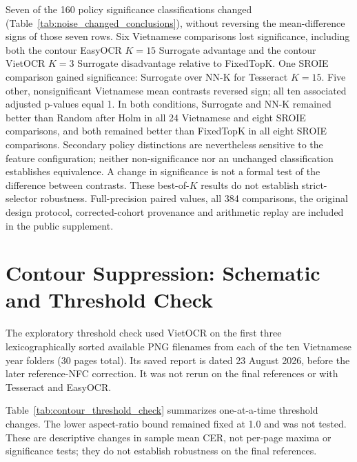 \documentclass{article}
\begin{document}
Seven of the 160 policy significance classifications changed (Table~\ref{tab:noise_changed_conclusions}), without reversing the mean-difference signs of those seven rows. Six Vietnamese comparisons lost significance, including both the contour EasyOCR $K=15$ Surrogate advantage and the contour VietOCR $K=3$ Surrogate disadvantage relative to FixedTopK. One SROIE comparison gained significance: Surrogate over NN-K for Tesseract $K=15$. Five other, nonsignificant Vietnamese mean contrasts reversed sign; all ten associated adjusted p-values equal 1. In both conditions, Surrogate and NN-K remained better than Random after Holm in all 24 Vietnamese and eight SROIE comparisons, and both remained better than FixedTopK in all eight SROIE comparisons. Secondary policy distinctions are nevertheless sensitive to the feature configuration; neither non-significance nor an unchanged classification establishes equivalence. A change in significance is not a formal test of the difference between contrasts. These best-of-$K$ results do not establish strict-selector robustness. Full-precision paired values, all 384 comparisons, the original design protocol, corrected-cohort provenance and arithmetic replay are included in the public supplement.



\section{Contour Suppression: Schematic and Threshold Check}

The exploratory threshold check used VietOCR on the first three lexicographically sorted available PNG filenames from each of the ten Vietnamese year folders (30 pages total). Its saved report is dated 23 August 2026, before the later reference-NFC correction. It was not rerun on the final references or with Tesseract and EasyOCR.

Table~\ref{tab:contour_threshold_check} summarizes one-at-a-time threshold changes. The lower aspect-ratio bound remained fixed at 1.0 and was not tested. These are descriptive changes in sample mean CER, not per-page maxima or significance tests; they do not establish robustness on the final references.
\end{document}
